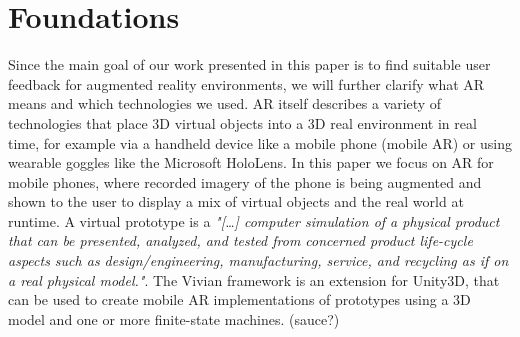 \documentclass[11pt, a4paper]{article}
\begin{document}
	\section*{Foundations}\label{sec:foundations}
		Since the main goal of our work presented in this paper is to find suitable user feedback for augmented reality environments, we will further clarify what \ac{AR} means and which technologies we used. \ac{AR} itself describes a variety of technologies that place 3D virtual objects into a 3D real environment in real time, for example via a handheld device like a mobile phone (mobile \ac{AR}) or using wearable goggles like the Microsoft HoloLens. In this paper we focus on \ac{AR} for mobile phones, where recorded imagery of the phone is being augmented and shown to the user to display a mix of virtual objects and the real world at runtime.
		A virtual prototype is a \textit{"\textnormal{[…]} computer simulation of a physical product that can be presented, analyzed, and tested from concerned product life-cycle aspects such as design/engineering, manufacturing, service, and recycling as if on a real physical model."}\cite{Wang2002}. The Vivian framework is an extension for Unity3D, that can be used to create mobile \ac{AR} implementations of prototypes using a 3D model and one or more finite-state machines. (sauce?)
\end{document}
